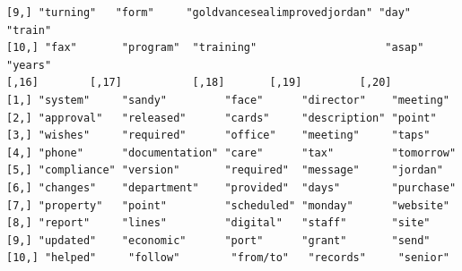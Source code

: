 \documentclass[a4paper]{article}
\begin{document}
\begin{verbatim}
[9,] "turning"   "form"     "goldvancesealimprovedjordan" "day"      "train"   
[10,] "fax"       "program"  "training"                    "asap"     "years"   
[,16]        [,17]           [,18]       [,19]         [,20]     
[1,] "system"     "sandy"         "face"      "director"    "meeting" 
[2,] "approval"   "released"      "cards"     "description" "point"   
[3,] "wishes"     "required"      "office"    "meeting"     "taps"    
[4,] "phone"      "documentation" "care"      "tax"         "tomorrow"
[5,] "compliance" "version"       "required"  "message"     "jordan"  
[6,] "changes"    "department"    "provided"  "days"        "purchase"
[7,] "property"   "point"         "scheduled" "monday"      "website" 
[8,] "report"     "lines"         "digital"   "staff"       "site"    
[9,] "updated"    "economic"      "port"      "grant"       "send"    
[10,] "helped"     "follow"        "from/to"   "records"     "senior"  
\end{verbatim}
\end{document}
